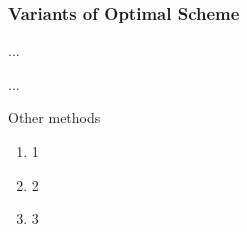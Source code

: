 \subsubsection{Variants of Optimal Scheme}

... 


\begin{theorem}
    
\end{theorem}

...


Other methods
\begin{enumerate}
    \item 1
    \item 2
    \item 3
\end{enumerate}

\begin{lemma}
    
\end{lemma}